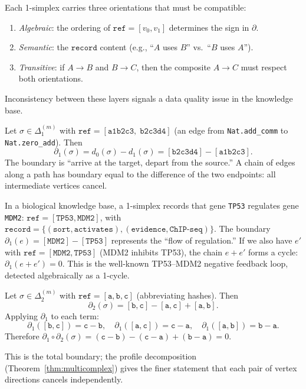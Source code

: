\begin{remark}
\label{rem:orientation}
Each 1-simplex carries three orientations that must be compatible:
\begin{enumerate}
\item \emph{Algebraic}: the ordering of $\texttt{ref} = [v_0, v_1]$ determines the sign in $\partial$.
\item \emph{Semantic}: the $\texttt{record}$ content (e.g., ``$A$ uses $B$'' vs.\ ``$B$ uses $A$'').
\item \emph{Transitive}: if $A \to B$ and $B \to C$, then the composite $A \to C$ must respect both orientations.
\end{enumerate}
Inconsistency between these layers signals a data quality issue in the knowledge base.
\end{remark}

\begin{example}
Let $\sigma \in \Delta^{(m)}_1$ with $\texttt{ref} = [\texttt{a1b2c3},\; \texttt{b2c3d4}]$ (an edge from \texttt{Nat.add\_comm} to \texttt{Nat.zero\_add}). Then
\[
\partial_1(\sigma) = d_0(\sigma) - d_1(\sigma) = [\texttt{b2c3d4}] - [\texttt{a1b2c3}].
\]
The boundary is ``arrive at the target, depart from the source.'' A chain of edges along a path has boundary equal to the difference of the two endpoints: all intermediate vertices cancel.
\end{example}

\begin{example}
In a biological knowledge base, a 1-simplex records that gene \texttt{TP53} regulates gene \texttt{MDM2}: $\texttt{ref} = [\texttt{TP53}, \texttt{MDM2}]$, with $\texttt{record} = \{(\texttt{sort}, \texttt{activates}), (\texttt{evidence}, \texttt{ChIP-seq})\}$. The boundary $\partial_1(e) = [\texttt{MDM2}] - [\texttt{TP53}]$ represents the ``flow of regulation.'' If we also have $e'$ with $\texttt{ref} = [\texttt{MDM2}, \texttt{TP53}]$ (MDM2 inhibits TP53), the chain $e + e'$ forms a cycle: $\partial_1(e + e') = 0$. This is the well-known TP53--MDM2 negative feedback loop, detected algebraically as a 1-cycle.
\end{example}

\begin{example}[Verification of $\partial^2 = 0$]
Let $\sigma \in \Delta^{(m)}_2$ with $\texttt{ref} = [\texttt{a}, \texttt{b}, \texttt{c}]$ (abbreviating hashes). Then
\[
\partial_2(\sigma) = [\texttt{b}, \texttt{c}] - [\texttt{a}, \texttt{c}] + [\texttt{a}, \texttt{b}].
\]
Applying $\partial_1$ to each term:
\[
\partial_1([\texttt{b},\texttt{c}]) = \texttt{c} - \texttt{b}, \quad
\partial_1([\texttt{a},\texttt{c}]) = \texttt{c} - \texttt{a}, \quad
\partial_1([\texttt{a},\texttt{b}]) = \texttt{b} - \texttt{a}.
\]
Therefore $\partial_1 \circ \partial_2(\sigma) = (\texttt{c} - \texttt{b}) - (\texttt{c} - \texttt{a}) + (\texttt{b} - \texttt{a}) = 0$. \checkmark

This is the total boundary; the profile decomposition (Theorem~\ref{thm:multicomplex}) gives the finer statement that each pair of vertex directions cancels independently.
\end{example}

